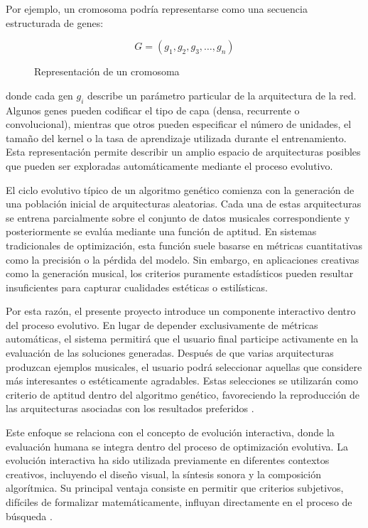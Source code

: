 \documentclass[12pt]{report}
\begin{document}
Por ejemplo, un cromosoma podría representarse como una secuencia estructurada de genes:

\begin{figure}[h]
\centering
\[
G = (g_1, g_2, g_3, \dots, g_n)
\] 
\caption{Representación de un cromosoma \cite{young2015optimizing}}
\end{figure}


donde cada gen $g_i$ describe un parámetro particular de la arquitectura de la red. Algunos genes pueden codificar el tipo de capa (densa, recurrente o convolucional), mientras que otros pueden especificar el número de unidades, el tamaño del kernel o la tasa de aprendizaje utilizada durante el entrenamiento. Esta representación permite describir un amplio espacio de arquitecturas posibles que pueden ser exploradas automáticamente mediante el proceso evolutivo.

El ciclo evolutivo típico de un algoritmo genético comienza con la generación de una población inicial de arquitecturas aleatorias. Cada una de estas arquitecturas se entrena parcialmente sobre el conjunto de datos musicales correspondiente y posteriormente se evalúa mediante una función de aptitud. En sistemas tradicionales de optimización, esta función suele basarse en métricas cuantitativas como la precisión o la pérdida del modelo. Sin embargo, en aplicaciones creativas como la generación musical, los criterios puramente estadísticos pueden resultar insuficientes para capturar cualidades estéticas o estilísticas.

Por esta razón, el presente proyecto introduce un componente interactivo dentro del proceso evolutivo. En lugar de depender exclusivamente de métricas automáticas, el sistema permitirá que el usuario final participe activamente en la evaluación de las soluciones generadas. Después de que varias arquitecturas produzcan ejemplos musicales, el usuario podrá seleccionar aquellas que considere más interesantes o estéticamente agradables. Estas selecciones se utilizarán como criterio de aptitud dentro del algoritmo genético, favoreciendo la reproducción de las arquitecturas asociadas con los resultados preferidos \cite{takagi2001interactive}.

Este enfoque se relaciona con el concepto de evolución interactiva, donde la evaluación humana se integra dentro del proceso de optimización evolutiva. La evolución interactiva ha sido utilizada previamente en diferentes contextos creativos, incluyendo el diseño visual, la síntesis sonora y la composición algorítmica. Su principal ventaja consiste en permitir que criterios subjetivos, difíciles de formalizar matemáticamente, influyan directamente en el proceso de búsqueda \cite{dawkins1986blind}.
\end{document}
